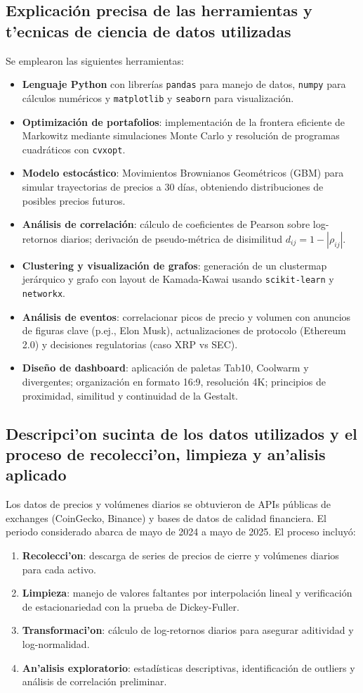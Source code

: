 \documentclass[12pt,letterpaper]{article}   %
\begin{document}
\subsection{Explicación precisa de las herramientas y t'{e}cnicas de ciencia de datos utilizadas}
Se emplearon las siguientes herramientas:
\begin{itemize}
\item \textbf{Lenguaje Python} con librerías \texttt{pandas} para manejo de datos, \texttt{numpy} para cálculos numéricos y \texttt{matplotlib} y \texttt{seaborn} para visualización.
\item \textbf{Optimización de portafolios}: implementación de la frontera eficiente de Markowitz mediante simulaciones Monte Carlo y resolución de programas cuadráticos con \texttt{cvxopt}.
\item \textbf{Modelo estocástico}: Movimientos Brownianos Geométricos (GBM) para simular trayectorias de precios a 30 días, obteniendo distribuciones de posibles precios futuros.
\item \textbf{Análisis de correlación}: cálculo de coeficientes de Pearson sobre log-retornos diarios; derivación de pseudo-métrica de disimilitud $d_{ij}=1-|\rho_{ij}|$.
\item \textbf{Clustering y visualización de grafos}: generación de un clustermap jerárquico y grafo con layout de Kamada-Kawai usando \texttt{scikit-learn} y \texttt{networkx}.
\item \textbf{Análisis de eventos}: correlacionar picos de precio y volumen con anuncios de figuras clave (p.ej., Elon Musk), actualizaciones de protocolo (Ethereum 2.0) y decisiones regulatorias (caso XRP vs SEC).
\item \textbf{Diseño de dashboard}: aplicación de paletas Tab10, Coolwarm y divergentes; organización en formato 16:9, resolución 4K; principios de proximidad, similitud y continuidad de la Gestalt.
\end{itemize}

\subsection{Descripci'{o}n sucinta de los datos utilizados y el proceso de recolecci'{o}n, limpieza y an'{a}lisis aplicado}
Los datos de precios y volúmenes diarios se obtuvieron de APIs públicas de exchanges (CoinGecko, Binance) y bases de datos de calidad financiera. El periodo considerado abarca de mayo de 2024 a mayo de 2025. El proceso incluyó:
\begin{enumerate}
\item \textbf{Recolecci'{o}n}: descarga de series de precios de cierre y volúmenes diarios para cada activo.
\item \textbf{Limpieza}: manejo de valores faltantes por interpolación lineal y verificación de estacionariedad con la prueba de Dickey-Fuller.
\item \textbf{Transformaci'{o}n}: cálculo de log-retornos diarios para asegurar aditividad y log-normalidad.
\item \textbf{An'{a}lisis exploratorio}: estadísticas descriptivas, identificación de outliers y análisis de correlación preliminar.
\end{enumerate}
\end{document}
